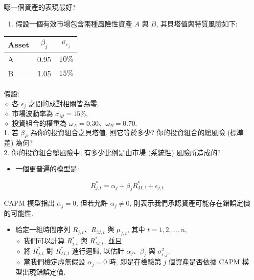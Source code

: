 \documentclass[letterpaper]{article}
\begin{document}
哪一個資產的表現最好? 

\begin{enumerate}
	\item 假設一個有效市場包含兩種風險性資產 $A$ 與 $B$, 其貝塔值與特質風險如下: 
\end{enumerate}


\begin{center}
\begin{tabular}{lcc}
\hline
Asset & $\beta_{j}$ & $\sigma_{\epsilon_{j}}$ \\
\hline
A & 0.95 & $10 \%$ \\
B & 1.05 & $15 \%$ \\
\hline
\end{tabular}
\end{center}

假設: \\
$\diamond$ 各 $\epsilon_{j}$ 之間的成對相關皆為零, \\
$\diamond$ 市場波動率為 $\sigma_{M}=15\%$, \\
$\diamond$ 投資組合的權重為 $\omega_{A}=0.30$、$\omega_{B}=0.70$. \\

1. 若 $\beta_{P}$ 為你的投資組合之貝塔值, 則它等於多少? 你的投資組合的總風險 (標準差) 為何? \\
2. 你的投資組合總風險中, 有多少比例是由市場 (系統性) 風險所造成的? 


\begin{itemize}
  \item 一個更普遍的模型是: 
\end{itemize}

$$
R_{j, t}^{*}=\alpha_{j}+\beta_{j} R_{M, t}^{*}+\epsilon_{j, t}
$$

CAPM 模型指出 $\alpha_{j}=0$, 但若允許 $\alpha_{j} \neq 0$, 則表示我們承認資產可能存在錯誤定價的可能性. 

\begin{itemize}
	\item 給定一組時間序列 $R_{j, t}$、$R_{M, t}$ 與 $\mu_{f, t}$, 其中 $t=1, 2, \ldots, n$, \\
	$\diamond$ 我們可以計算 $R_{j, t}^{*}$ 與 $R_{M, t}^{*}$, 並且\\
	$\diamond$ 將 $R_{j, t}^{*}$ 對 $R_{M, t}^{*}$ 進行迴歸, 以估計 $\alpha_{j}$、$\beta_{j}$ 與 $\sigma_{\epsilon, j}^{2}$. \\
	$\diamond$ 當我們檢定虛無假設 $\alpha_{j}=0$ 時, 即是在檢驗第 $j$ 個資產是否依據 CAPM 模型出現錯誤定價. 
\end{itemize}
\end{document}
